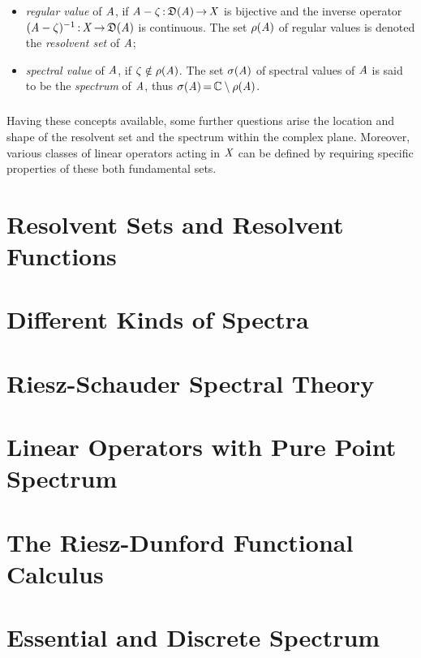 \documentclass[11pt,twoside]{article}
\begin{document}
\begin{itemize}[leftmargin=12pt]
\item[1.]
\textit{regular value} of $\mathit{A}$,
if $\mathit{A} - \zeta {\,:\,} \mathfrak{D}(\mathit{A}) {\,\to\,} \mathit{X}$ is bijective and
the inverse operator $(\mathit{A}-\zeta)^{-1} {\,:\,} \mathit{X} {\,\to\,} \mathfrak{D}(\mathit{A})$
is continuous.
The set $\rho(\mathit{A})$ of regular values is denoted
the \textit{resolvent set} of $\mathit{A}$;

\item[2.]
\textit{spectral value} of $\mathit{A}$,
if $\zeta \notin \rho(\mathit{A})$.
The set $\sigma(\mathit{A})$ of spectral values of $\mathit{A}$ is said to be
the \textit{spectrum} of $\mathit{A}$,
thus $\sigma(\mathit{A}) {\,=\,} {\mathbb{C}} \setminus \rho(\mathit{A})$.
\end{itemize}

\subparagraph{}
Having these concepts available,
some further questions arise {\wrt} the location and shape
of the resolvent set and the spectrum within the complex plane.
Moreover,
various classes of linear operators acting in $\mathit{X}$ can be defined
by requiring specific properties of these both fundamental sets.

\section{Resolvent Sets and Resolvent Functions}
\section{Different Kinds of Spectra}
\section{Riesz-Schauder Spectral Theory}
\section{Linear Operators with Pure Point Spectrum}
\section{The Riesz-Dunford Functional Calculus}
\section{Essential and Discrete Spectrum}
\end{document}
